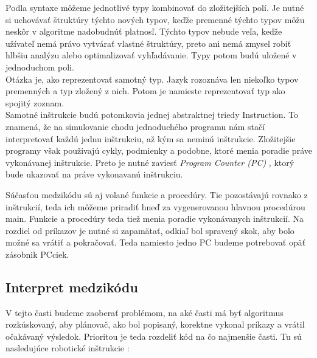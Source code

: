 Podla syntaxe môžeme jednotlivé typy kombinovať do zložitejších polí. Je nutné si uchovávať štruktúry týchto nových typov, keďže premenné týchto typov môžu neskôr v algoritme nadobudnúť platnosľ. Týchto typov nebude veľa, keďže užívateľ nemá právo vytvárať vlastné štruktúry, preto ani nemá zmysel robiť hlbšiu analýzu alebo optimalizovať vyhľadávanie. Typy potom budú uložené v jednoduchom poli. \\

Otázka je, ako reprezentovať samotný typ. Jazyk rozoznáva len niekoľko typov premenných a typ zložený z nich. Potom je namieste reprezentovať typ ako spojitý zoznam. \\

Samotné inštrukcie budú potomkovia jednej abstraktnej triedy Instruction. To znamená, že na simulovanie chodu jednoduchého programu nám stačí interpretovať každú jednu inštrukciu, až kým sa neminú inštrukcie. Zložitejšie programy však použivajú cykly, podmienky a podobne, ktoré menia poradie práve vykonávanej inštrukcie. Preto je nutné zaviesť {\it Program Counter (PC) }, ktorý bude ukazovať na  práve vykonavanú inštrukciu.

Súčasťou medzikódu sú aj volané funkcie a procedúry. Tie pozostávajú rovnako z inštrukcií, teda ich môžeme priradiť hneď za vygenerovanou hlavnou procedúrou main. Funkcie a procedúry teda tiež menia poradie vykonávanych inštrukcií. Na rozdiel od príkazov je nutné si zapamätať, odkiaľ bol spravený skok, aby bolo možné sa vrátiť a pokračovať. Teda namiesto jedno PC budeme potrebovať opäť zásobnik PCciek.\\

\subsection{Interpret medzikódu}
V tejto časti budeme zaoberať problémom, na aké časti má byť algoritmus rozkúskovaný, aby plánovač, ako bol popisaný, korektne vykonal príkazy a vrátil očakávaný výsledok. Prioritou je teda rozdeliť kód na čo najmenšie časti. Tu sú nasledujúce robotické inštrukcie :%

